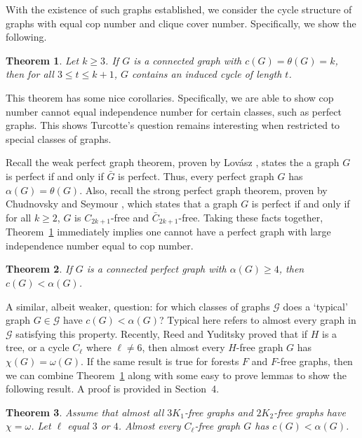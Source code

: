 \documentclass[12pt]{amsart}
\newtheorem{theorem}{Theorem}[section]
\theoremstyle{definition}
\begin{document}
With the existence of such graphs established, we consider the cycle structure of graphs with equal cop number and clique cover number.
Specifically, we show the following.

\begin{theorem}\label{Thm: Clique Cover = Cop Structure}
    Let $k\geq 3$.
    If $G$ is a connected graph with $c(G) = \theta(G) = k$, then for all $3 \leq t \leq k+1$, $G$ contains an induced cycle of length $t$.
\end{theorem}

This theorem has some nice corollaries. 
Specifically, we are able to show cop number cannot equal independence number for certain classes, such as perfect graphs.
This shows Turcotte's question remains interesting when restricted to special classes of graphs.

Recall the weak perfect graph theorem, proven by Lov\'asz \cite{lovasz1972normal}, states the a graph $G$ is perfect if and only if $\bar{G}$ is perfect.
Thus, every perfect graph $G$ has $\alpha(G) = \theta(G)$.
Also, recall the strong perfect graph theorem, proven by Chudnovsky and Seymour \cite{chudnovsky2006strong}, which states that a graph $G$ is perfect if and only if for all $k\geq 2$, $G$ is $C_{2k+1}$-free and $\bar{C}_{2k+1}$-free.
Taking these facts together, Theorem~\ref{Thm: Clique Cover = Cop Structure} immediately implies one cannot have a perfect graph with large independence number equal to cop number.

\begin{theorem}\label{Coro: Perfect Graphs}
    If $G$ is a connected perfect graph with $\alpha(G) \geq 4$, then $c(G) < \alpha(G)$.
\end{theorem}


A similar, albeit weaker, question:
for which classes of graphs $\mathcal{G}$ does a `typical' graph $G \in \mathcal{G}$ have $c(G) < \alpha(G)$?
Typical here refers to almost every graph in $\mathcal{G}$ satisfying this property.
Recently, Reed and Yuditsky \cite{reed2025asymptotic} proved that if $H$ is a tree, or a cycle $C_\ell$ where $\ell\neq 6$, then 
almost every $H$-free graph $G$ has $\chi(G) = \omega(G)$.
If the same result is true for forests $F$ and $F$-free graphs, 
then we can combine Theorem~\ref{Thm: Clique Cover = Cop Structure} along with some easy to prove lemmas
to show the following result.
A proof is provided in Section~4.


\begin{theorem}\label{Coro: typical C_l-free Graphs}
    Assume that almost all $3K_1$-free graphs and $2K_2$-free graphs have $\chi = \omega$.
    Let $\ell$ equal $3$ or $4$.
    Almost every $C_\ell$-free graph $G$ has $c(G) < \alpha(G)$.
\end{theorem}
\end{document}
